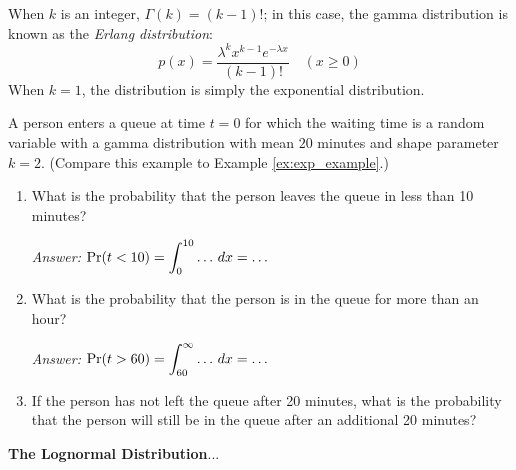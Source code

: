 When $k$ is an integer, $\Gamma(k) = (k-1)!$; in this case,
the gamma distribution is known as the \emph{Erlang distribution}:
\begin{equation}
  p(x) = \frac{\lambda^{k} x^{k-1} e^{-\lambda x}}{(k-1)!}
   \quad (x \ge 0)
\end{equation}
When $k=1$, the distribution is simply the exponential distribution.
%
\begin{xexample}
A person enters a queue at time $t=0$ for which the
waiting time is a random variable with a gamma distribution
with mean $20$ minutes and shape parameter $k=2$.
(Compare this example to Example \ref{ex:exp_example}.)
\begin{enumerate}
\item What is the probability that the person leaves the
queue in less than 10 minutes?

\noindent
\emph{Answer:} $\displaystyle \Pr(t < 10) = \int_0^{10} \ldots \,dx
     = \ldots$
\item What is the probability that the person is in the queue for
more than an hour?

\noindent
\emph{Answer:}
 $\displaystyle \Pr(t > 60) = \int_{60}^{\infty} \ldots \,dx
     = \ldots$

\item If the person has not left the queue after 20 minutes, what is the
probability that the person will still be in the queue after an additional
20 minutes?
\end{enumerate}
\end{xexample}

\noindent
\textbf{The Lognormal Distribution}...
